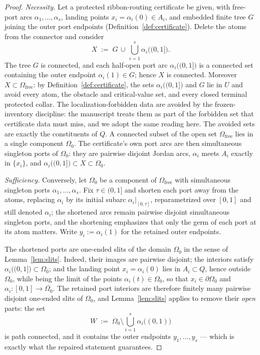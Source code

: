 \documentclass[11pt,reqno]{amsart}
\theoremstyle{definition}
\theoremstyle{remark}
\newcommand{\Omfree}{\Omega_{\mathrm{free}}}
\begin{document}
\begin{proof}
\emph{Necessity.}
Let a protected ribbon-routing certificate be given, with free-port arcs
$\alpha_1,\dots,\alpha_s$, landing points $x_i=\alpha_i(0)\in A_i$, and embedded finite
tree $G$ joining the outer port endpoints (Definition~\ref{def:certificate}). Delete the
atoms from the connector and consider
\[
X\;:=\;G\,\cup\,\bigcup_{i=1}^{s}\alpha_i\bigl((0,1]\bigr).
\]
The tree $G$ is connected, and each half-open port arc $\alpha_i\bigl((0,1]\bigr)$ is a
connected set containing the outer endpoint $\alpha_i(1)\in G$; hence $X$ is connected.
Moreover $X\subset\Omfree$: by Definition~\ref{def:certificate}, the sets
$\alpha_i\bigl((0,1]\bigr)$ and $G$ lie in $U$ and avoid every atom, the obstacle and
critical-value set, and every closed terminal protected collar.  The
localization-forbidden data are avoided by the frozen-inventory discipline: the
manuscript treats them as part of the forbidden set that certificate data must miss, and
we adopt the same reading here.  The avoided sets are exactly the constituents of $Q$. A
connected subset of the open set $\Omfree$ lies in a single component $\Omega_0$. The
certificate's own port arcs are then simultaneous singleton ports of $\Omega_0$: they
are pairwise disjoint Jordan arcs, $\alpha_i$ meets $A_i$ exactly in $\{x_i\}$, and
$\alpha_i\bigl((0,1]\bigr)\subset X\subset\Omega_0$.

\emph{Sufficiency.}
Conversely, let $\Omega_0$ be a component of $\Omfree$ with simultaneous singleton ports
$\alpha_1,\dots,\alpha_s$. Fix $\tau\in(0,1]$ and shorten each port away from the atoms,
replacing $\alpha_i$ by its initial subarc $\alpha_i|_{[0,\tau]}$, reparametrized over
$[0,1]$ and still denoted $\alpha_i$; the shortened arcs remain pairwise disjoint
simultaneous singleton ports, and the shortening emphasizes that only the germ of each
port at its atom matters. Write $y_i:=\alpha_i(1)$ for the retained outer endpoints.

The shortened ports are one-ended slits of the domain $\Omega_0$ in the sense of
Lemma~\ref{lem:slits}. Indeed, their images are pairwise disjoint; the interiors satisfy
$\alpha_i\bigl((0,1]\bigr)\subset\Omega_0$; and the landing point
$x_i=\alpha_i(0)$ lies in $A_i\subset Q$, hence outside $\Omega_0$, while being the
limit of the points $\alpha_i(t)\in\Omega_0$, so that $x_i\in\partial\Omega_0$ and
$\alpha_i\colon[0,1]\to\overline{\Omega_0}$. The retained port interiors are therefore
finitely many pairwise disjoint one-ended slits of $\Omega_0$, and
Lemma~\ref{lem:slits} applies to remove their \emph{open} parts: the set
\[
W\;:=\;\Omega_0\setminus\bigcup_{i=1}^{s}\alpha_i\bigl((0,1)\bigr)
\]
is path connected, and it contains the outer endpoints $y_1,\dots,y_s$ --- which is
exactly what the repaired statement guarantees.


\end{proof}
\end{document}
